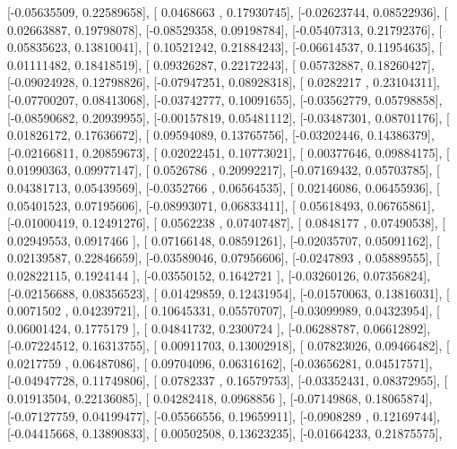 \documentclass{article}
\begin{document}
       [-0.05635509,  0.22589658],
       [ 0.0468663 ,  0.17930745],
       [-0.02623744,  0.08522936],
       [ 0.02663887,  0.19798078],
       [-0.08529358,  0.09198784],
       [-0.05407313,  0.21792376],
       [ 0.05835623,  0.13810041],
       [ 0.10521242,  0.21884243],
       [-0.06614537,  0.11954635],
       [ 0.01111482,  0.18418519],
       [ 0.09326287,  0.22172243],
       [ 0.05732887,  0.18260427],
       [-0.09024928,  0.12798826],
       [-0.07947251,  0.08928318],
       [ 0.0282217 ,  0.23104311],
       [-0.07700207,  0.08413068],
       [-0.03742777,  0.10091655],
       [-0.03562779,  0.05798858],
       [-0.08590682,  0.20939955],
       [-0.00157819,  0.05481112],
       [-0.03487301,  0.08701176],
       [ 0.01826172,  0.17636672],
       [ 0.09594089,  0.13765756],
       [-0.03202446,  0.14386379],
       [-0.02166811,  0.20859673],
       [ 0.02022451,  0.10773021],
       [ 0.00377646,  0.09884175],
       [ 0.01990363,  0.09977147],
       [ 0.0526786 ,  0.20992217],
       [-0.07169432,  0.05703785],
       [ 0.04381713,  0.05439569],
       [-0.0352766 ,  0.06564535],
       [ 0.02146086,  0.06455936],
       [ 0.05401523,  0.07195606],
       [-0.08993071,  0.06833411],
       [ 0.05618493,  0.06765861],
       [-0.01000419,  0.12491276],
       [ 0.0562238 ,  0.07407487],
       [ 0.0848177 ,  0.07490538],
       [ 0.02949553,  0.0917466 ],
       [ 0.07166148,  0.08591261],
       [-0.02035707,  0.05091162],
       [ 0.02139587,  0.22846659],
       [-0.03589046,  0.07956606],
       [-0.0247893 ,  0.05889555],
       [ 0.02822115,  0.1924144 ],
       [-0.03550152,  0.1642721 ],
       [-0.03260126,  0.07356824],
       [-0.02156688,  0.08356523],
       [ 0.01429859,  0.12431954],
       [-0.01570063,  0.13816031],
       [ 0.0071502 ,  0.04239721],
       [ 0.10645331,  0.05570707],
       [-0.03099989,  0.04323954],
       [ 0.06001424,  0.1775179 ],
       [ 0.04841732,  0.2300724 ],
       [-0.06288787,  0.06612892],
       [-0.07224512,  0.16313755],
       [ 0.00911703,  0.13002918],
       [ 0.07823026,  0.09466482],
       [ 0.0217759 ,  0.06487086],
       [ 0.09704096,  0.06316162],
       [-0.03656281,  0.04517571],
       [-0.04947728,  0.11749806],
       [ 0.0782337 ,  0.16579753],
       [-0.03352431,  0.08372955],
       [ 0.01913504,  0.22136085],
       [ 0.04282418,  0.0968856 ],
       [-0.07149868,  0.18065874],
       [-0.07127759,  0.04199477],
       [-0.05566556,  0.19659911],
       [-0.0908289 ,  0.12169744],
       [-0.04415668,  0.13890833],
       [ 0.00502508,  0.13623235],
       [-0.01664233,  0.21875575],
\end{document}
